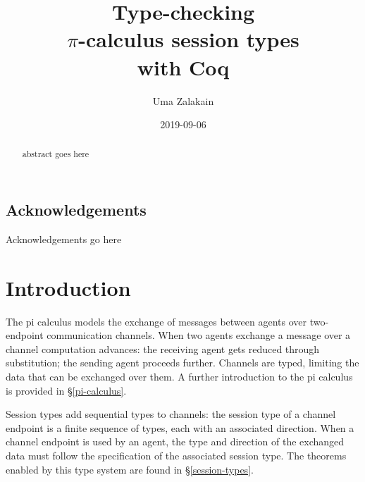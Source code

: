 \documentclass{mproj}
\begin{document}
\title{Type-checking\\ $\pi$-calculus session types\\ with Coq}
\author{Uma Zalakain}
\date{2019-09-06}
\maketitle

\begin{abstract}
abstract goes here
\end{abstract}

\educationalconsent
\vfill{}
\doclicenseThis
\newpage

\section*{Acknowledgements}

Acknowledgements go here

\tableofcontents

\chapter{Introduction}\label{intro}

The pi calculus models the exchange of messages between agents over two-endpoint
communication channels. When two agents exchange a message over a channel
computation advances: the receiving agent gets reduced through substitution; the
sending agent proceeds further. Channels are typed, limiting the data that can
be exchanged over them. A further introduction to the pi calculus is provided in
\S \ref{pi-calculus}.

Session types add sequential types to channels: the session type of a channel
endpoint is a finite sequence of types, each with an associated direction.  When
a channel endpoint is used by an agent, the type and direction of the exchanged
data must follow the specification of the associated session type. The theorems
enabled by this type system are found in \S \ref{session-types}.
\end{document}
